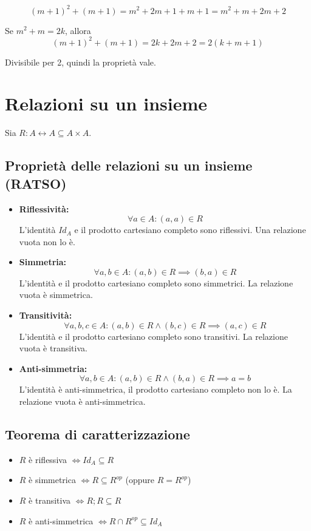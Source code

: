 \documentclass[a4paper,12pt]{article}
\let\oldsection\section
\renewcommand{\section}{\clearpage\oldsection}
\begin{document}
\[
(m+1)^2 + (m+1) = m^2 + 2m + 1 + m + 1 = m^2 + m + 2m + 2
\]

Se $m^2 + m = 2k$, allora
\[
(m+1)^2 + (m+1) = 2k + 2m + 2 = 2(k + m + 1)
\]

Divisibile per 2, quindi la proprietà vale.

\section{Relazioni su un insieme}

Sia $R: A \leftrightarrow A \subseteq A \times A$.

\subsection{Proprietà delle relazioni su un insieme (RATSO)}

\begin{itemize}
    \item \textbf{Riflessività:} 
    \[
    \forall a \in A : (a,a) \in R
    \]
    L'identità $Id_A$ e il prodotto cartesiano completo sono riflessivi. Una relazione vuota non lo è.
    
    \item \textbf{Simmetria:} 
    \[
    \forall a,b \in A : (a,b) \in R \implies (b,a) \in R
    \]
    L'identità e il prodotto cartesiano completo sono simmetrici. La relazione vuota è simmetrica.
    
    \item \textbf{Transitività:} 
    \[
    \forall a,b,c \in A : (a,b) \in R \wedge (b,c) \in R \implies (a,c) \in R
    \]
    L'identità e il prodotto cartesiano completo sono transitivi. La relazione vuota è transitiva.
    
    \item \textbf{Anti-simmetria:} 
    \[
    \forall a,b \in A : (a,b) \in R \wedge (b,a) \in R \implies a = b
    \]
    L'identità è anti-simmetrica, il prodotto cartesiano completo non lo è. La relazione vuota è anti-simmetrica.
\end{itemize}

\subsection{Teorema di caratterizzazione}

\begin{itemize}
    \item $R$ è riflessiva $\iff Id_A \subseteq R$
    \item $R$ è simmetrica $\iff R \subseteq R^{op}$ (oppure $R = R^{op}$)
    \item $R$ è transitiva $\iff R;R \subseteq R$
    \item $R$ è anti-simmetrica $\iff R \cap R^{op} \subseteq Id_A$
\end{itemize}
\end{document}
